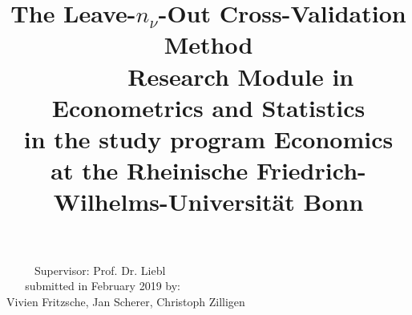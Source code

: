 \documentclass[Research_Module_ES.tex]{subfiles}
\begin{document}
\title{\LARGE{\textbf{The Leave-$n_\nu$-Out Cross-Validation Method}}\\
	~
	\newline\newline\newline
	~										
	\newline\newline\newline
	~
	\doublespacing
	\normalsize	
	Research Module in Econometrics and Statistics\\
	in the study program Economics\\
	at the Rheinische Friedrich-Wilhelms-Universität Bonn}

\onehalfspacing			
\author{}
\date{}
\maketitle	
\begin{center}
	\normalsize 
	~										
	\newline\newline\newline
	~										
	\newline\newline\newline
	~
	Supervisor: Prof. Dr. Liebl\\
	~
	\newline\newline\newline
	~	
	submitted in February 2019 by:\\ 
	Vivien Fritzsche, Jan Scherer, Christoph Zilligen 
\end{center}	
	
\end{document}
